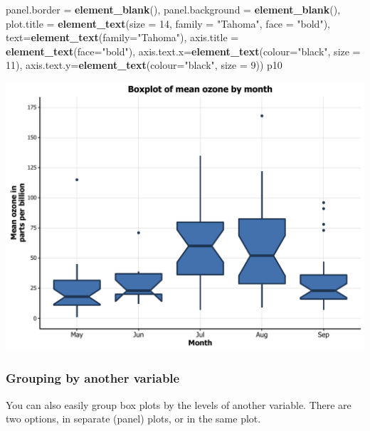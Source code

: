 \documentclass[]{article}
\newenvironment{Shaded}{\begin{snugshade}}{\end{snugshade}}
\newcommand{\KeywordTok}[1]{\textcolor[rgb]{0.13,0.29,0.53}{\textbf{{#1}}}}
\newcommand{\DataTypeTok}[1]{\textcolor[rgb]{0.13,0.29,0.53}{{#1}}}
\newcommand{\DecValTok}[1]{\textcolor[rgb]{0.00,0.00,0.81}{{#1}}}
\newcommand{\StringTok}[1]{\textcolor[rgb]{0.31,0.60,0.02}{{#1}}}
\newcommand{\NormalTok}[1]{{#1}}
\begin{document}
\begin{Shaded}
\begin{Highlighting}[]
              \DataTypeTok{panel.border =} \KeywordTok{element_blank}\NormalTok{(), }\DataTypeTok{panel.background =} \KeywordTok{element_blank}\NormalTok{(),}
              \DataTypeTok{plot.title =} \KeywordTok{element_text}\NormalTok{(}\DataTypeTok{size =} \DecValTok{14}\NormalTok{, }\DataTypeTok{family =} \StringTok{"Tahoma"}\NormalTok{, }\DataTypeTok{face =} \StringTok{"bold"}\NormalTok{),}
              \DataTypeTok{text=}\KeywordTok{element_text}\NormalTok{(}\DataTypeTok{family=}\StringTok{"Tahoma"}\NormalTok{), }
              \DataTypeTok{axis.title =} \KeywordTok{element_text}\NormalTok{(}\DataTypeTok{face=}\StringTok{"bold"}\NormalTok{),}
              \DataTypeTok{axis.text.x=}\KeywordTok{element_text}\NormalTok{(}\DataTypeTok{colour=}\StringTok{"black"}\NormalTok{, }\DataTypeTok{size =} \DecValTok{11}\NormalTok{), }
              \DataTypeTok{axis.text.y=}\KeywordTok{element_text}\NormalTok{(}\DataTypeTok{colour=}\StringTok{"black"}\NormalTok{, }\DataTypeTok{size =} \DecValTok{9}\NormalTok{)) }
\NormalTok{p10}
\end{Highlighting}
\end{Shaded}

\begin{center}\includegraphics{0_all_posts_pdf/box_15-1} \end{center}

\subsubsection{Grouping by another
variable}\label{grouping-by-another-variable}

You can also easily group box plots by the levels of another variable.
There are two options, in separate (panel) plots, or in the same plot.
\end{document}
